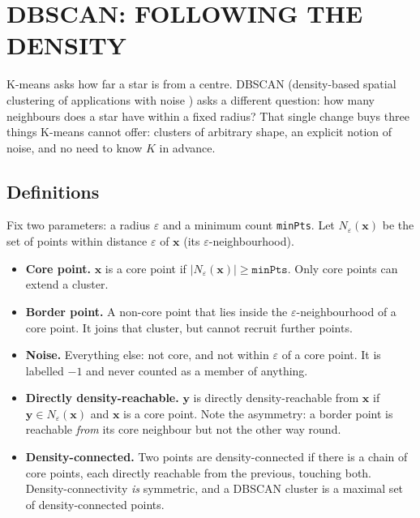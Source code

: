 \section{DBSCAN: FOLLOWING THE DENSITY}
\label{sec:dbscan}


K-means asks how far a star is from a centre. DBSCAN (density-based spatial
clustering of applications with noise \citep{Ester:96}) asks a different
question: how many neighbours does a star have within a fixed radius? That
single change buys three things K-means cannot offer: clusters of arbitrary
shape, an explicit notion of noise, and no need to know $K$ in advance.

\subsection{Definitions}

Fix two parameters: a radius $\varepsilon$ and a minimum count
\texttt{minPts}. Let $N_\varepsilon(\mathbf{x})$ be the set of points within
distance $\varepsilon$ of $\mathbf{x}$ (its $\varepsilon$-neighbourhood).

\begin{itemize}
\item \textbf{Core point.} $\mathbf{x}$ is a core point if
  $|N_\varepsilon(\mathbf{x})| \geq \texttt{minPts}$. Only core points can
  extend a cluster.
\item \textbf{Border point.} A non-core point that lies inside the
  $\varepsilon$-neighbourhood of a core point. It joins that cluster, but
  cannot recruit further points.
\item \textbf{Noise.} Everything else: not core, and not within $\varepsilon$
  of a core point. It is labelled $-1$ and never counted as a member of
  anything.
\item \textbf{Directly density-reachable.} $\mathbf{y}$ is directly
  density-reachable from $\mathbf{x}$ if $\mathbf{y} \in
  N_\varepsilon(\mathbf{x})$ and $\mathbf{x}$ is a core point. Note the
  asymmetry: a border point is reachable \emph{from} its core neighbour but
  not the other way round.
\item \textbf{Density-connected.} Two points are density-connected if there is
  a chain of core points, each directly reachable from the previous, touching
  both. Density-connectivity \emph{is} symmetric, and a DBSCAN cluster is a
  maximal set of density-connected points.
\end{itemize}

